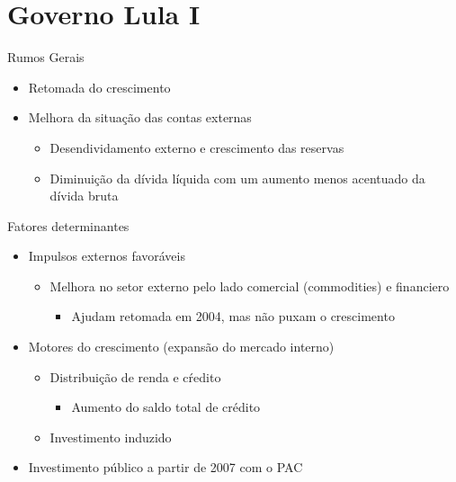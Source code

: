 \documentclass[presentation]{beamer}
\begin{document}
\section{Governo Lula I}
\label{sec:orgc6f0ca3}

\begin{frame}[label={sec:orgdeb0797}]{Rumos Gerais}
\begin{itemize}
\item Retomada do crescimento
\item Melhora da situação das contas externas
\begin{itemize}
\item Desendividamento externo e crescimento das reservas
\item Diminuição da dívida líquida com um aumento menos acentuado da dívida bruta
\end{itemize}
\end{itemize}
\end{frame}

\begin{frame}[label={sec:org8242e3c}]{Fatores determinantes}
\begin{itemize}
\item Impulsos externos favoráveis
\begin{itemize}
\item Melhora no setor externo pelo lado comercial (commodities) e financiero
\begin{itemize}
\item Ajudam retomada em 2004, mas não puxam o crescimento
\end{itemize}
\end{itemize}
\item Motores do crescimento (expansão do mercado interno)
\begin{itemize}
\item Distribuição de renda e cŕedito
\begin{itemize}
\item Aumento do saldo total de crédito
\end{itemize}
\item Investimento induzido
\end{itemize}
\item Investimento público a partir de 2007 com o PAC
\end{itemize}
\end{frame}
\end{document}
